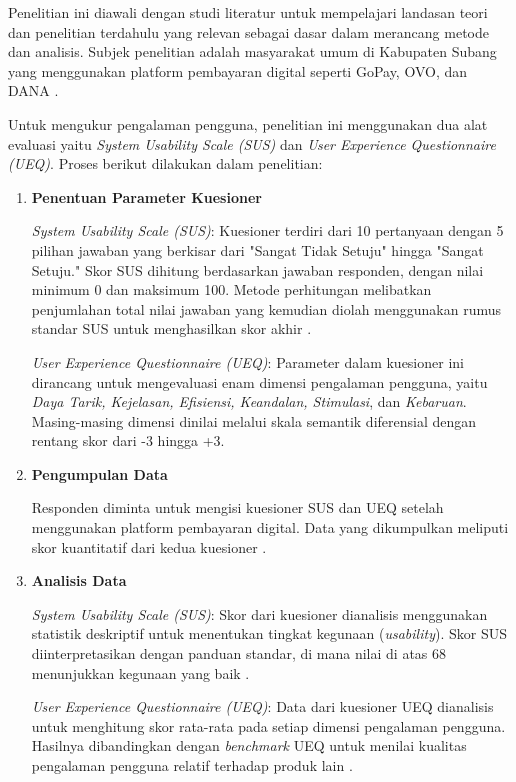 \documentclass[
 manuscript=article,  %
  layout=publish, 
  year=2024, 
  month= Februari, %
  volume=8,
  number=1 
]{JIKO}
\begin{document}
\noindent\hspace{1cm}Penelitian ini diawali dengan studi literatur untuk mempelajari landasan teori dan penelitian terdahulu yang relevan sebagai dasar dalam merancang metode dan analisis. Subjek penelitian adalah masyarakat umum di Kabupaten Subang yang menggunakan platform pembayaran digital seperti GoPay, OVO, dan DANA \cite{1}.

\noindent\hspace{1cm}Untuk mengukur pengalaman pengguna, penelitian ini menggunakan dua alat evaluasi yaitu \textit{System Usability Scale (SUS)} dan \textit{User Experience Questionnaire (UEQ)}. Proses berikut dilakukan dalam penelitian:

\begin{enumerate}[leftmargin=2em]
    \item \textbf{Penentuan Parameter Kuesioner}

    \noindent\hspace{1cm}\textit{System Usability Scale (SUS)}: Kuesioner terdiri dari 10 pertanyaan dengan 5 pilihan jawaban yang berkisar dari "Sangat Tidak Setuju" hingga "Sangat Setuju." Skor SUS dihitung berdasarkan jawaban responden, dengan nilai minimum 0 dan maksimum 100. Metode perhitungan melibatkan penjumlahan total nilai jawaban yang kemudian diolah menggunakan rumus standar SUS untuk menghasilkan skor akhir \cite{11}.

    \noindent\hspace{1cm}\textit{User Experience Questionnaire (UEQ)}: Parameter dalam kuesioner ini dirancang untuk mengevaluasi enam dimensi pengalaman pengguna, yaitu \textit{Daya Tarik, Kejelasan, Efisiensi, Keandalan, Stimulasi}, dan \textit{Kebaruan}. Masing-masing dimensi dinilai melalui skala semantik diferensial dengan rentang skor dari -3 hingga +3.

    \item \textbf{Pengumpulan Data}

    \noindent\hspace{1cm}Responden diminta untuk mengisi kuesioner SUS dan UEQ setelah menggunakan platform pembayaran digital. Data yang dikumpulkan meliputi skor kuantitatif dari kedua kuesioner \cite{12}.

    \item \textbf{Analisis Data}

    \noindent\hspace{1cm}\textit{System Usability Scale (SUS)}: Skor dari kuesioner dianalisis menggunakan statistik deskriptif untuk menentukan tingkat kegunaan (\textit{usability}). Skor SUS diinterpretasikan dengan panduan standar, di mana nilai di atas 68 menunjukkan kegunaan yang baik \cite{14}.

    \noindent\hspace{1cm}\textit{User Experience Questionnaire (UEQ)}: Data dari kuesioner UEQ dianalisis untuk menghitung skor rata-rata pada setiap dimensi pengalaman pengguna. Hasilnya dibandingkan dengan \textit{benchmark} UEQ untuk menilai kualitas pengalaman pengguna relatif terhadap produk lain \cite{15}.
\end{enumerate}
\end{document}
